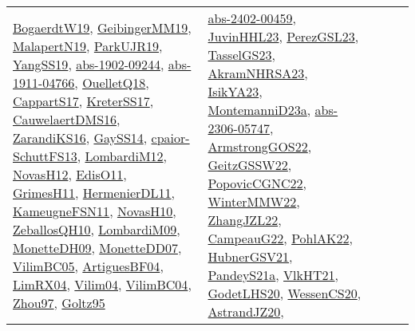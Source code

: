 {\begin{longtable}{lp{3cm}>{\raggedright}p{6cm}>{\raggedright}p{6cm}p{8cm}}
\href{papers/BogaerdtW19.pdf}{BogaerdtW19}\cite{BogaerdtW19}, \href{papers/GeibingerMM19.pdf}{GeibingerMM19}\cite{GeibingerMM19}, \href{papers/MalapertN19.pdf}{MalapertN19}\cite{MalapertN19}, \href{papers/ParkUJR19.pdf}{ParkUJR19}\cite{ParkUJR19}, \href{papers/YangSS19.pdf}{YangSS19}\cite{YangSS19}, \href{articles/abs-1902-09244.pdf}{abs-1902-09244}\cite{abs-1902-09244}, \href{articles/abs-1911-04766.pdf}{abs-1911-04766}\cite{abs-1911-04766}, \href{papers/OuelletQ18.pdf}{OuelletQ18}\cite{OuelletQ18}, \href{papers/CappartS17.pdf}{CappartS17}\cite{CappartS17}, \href{articles/KreterSS17.pdf}{KreterSS17}\cite{KreterSS17}, \href{papers/CauwelaertDMS16.pdf}{CauwelaertDMS16}\cite{CauwelaertDMS16}, \href{articles/ZarandiKS16.pdf}{ZarandiKS16}\cite{ZarandiKS16}, \href{papers/GaySS14.pdf}{GaySS14}\cite{GaySS14}, \href{papers/cpaior-SchuttFS13.pdf}{cpaior-SchuttFS13}\cite{cpaior-SchuttFS13}, \href{articles/LombardiM12.pdf}{LombardiM12}\cite{LombardiM12}, \href{articles/NovasH12.pdf}{NovasH12}\cite{NovasH12}, \href{papers/EdisO11.pdf}{EdisO11}\cite{EdisO11}, \href{papers/GrimesH11.pdf}{GrimesH11}\cite{GrimesH11}, \href{papers/HermenierDL11.pdf}{HermenierDL11}\cite{HermenierDL11}, \href{papers/KameugneFSN11.pdf}{KameugneFSN11}\cite{KameugneFSN11}, \href{articles/NovasH10.pdf}{NovasH10}\cite{NovasH10}, \href{articles/ZeballosQH10.pdf}{ZeballosQH10}\cite{ZeballosQH10}, \href{papers/LombardiM09.pdf}{LombardiM09}\cite{LombardiM09}, \href{papers/MonetteDH09.pdf}{MonetteDH09}\cite{MonetteDH09}, \href{papers/MonetteDD07.pdf}{MonetteDD07}\cite{MonetteDD07}, \href{articles/VilimBC05.pdf}{VilimBC05}\cite{VilimBC05}, \href{papers/ArtiguesBF04.pdf}{ArtiguesBF04}\cite{ArtiguesBF04}, \href{papers/LimRX04.pdf}{LimRX04}\cite{LimRX04}, \href{papers/Vilim04.pdf}{Vilim04}\cite{Vilim04}, \href{papers/VilimBC04.pdf}{VilimBC04}\cite{VilimBC04}, \href{articles/Zhou97.pdf}{Zhou97}\cite{Zhou97}, \href{papers/Goltz95.pdf}{Goltz95}\cite{Goltz95} & \href{articles/abs-2402-00459.pdf}{abs-2402-00459}\cite{abs-2402-00459}, \href{papers/JuvinHHL23.pdf}{JuvinHHL23}\cite{JuvinHHL23}, \href{papers/PerezGSL23.pdf}{PerezGSL23}\cite{PerezGSL23}, \href{papers/TasselGS23.pdf}{TasselGS23}\cite{TasselGS23}, \href{articles/AkramNHRSA23.pdf}{AkramNHRSA23}\cite{AkramNHRSA23}, \href{articles/IsikYA23.pdf}{IsikYA23}\cite{IsikYA23}, \href{articles/MontemanniD23a.pdf}{MontemanniD23a}\cite{MontemanniD23a}, \href{articles/abs-2306-05747.pdf}{abs-2306-05747}\cite{abs-2306-05747}, \href{papers/ArmstrongGOS22.pdf}{ArmstrongGOS22}\cite{ArmstrongGOS22}, \href{papers/GeitzGSSW22.pdf}{GeitzGSSW22}\cite{GeitzGSSW22}, \href{papers/PopovicCGNC22.pdf}{PopovicCGNC22}\cite{PopovicCGNC22}, \href{papers/WinterMMW22.pdf}{WinterMMW22}\cite{WinterMMW22}, \href{papers/ZhangJZL22.pdf}{ZhangJZL22}\cite{ZhangJZL22}, \href{articles/CampeauG22.pdf}{CampeauG22}\cite{CampeauG22}, \href{articles/PohlAK22.pdf}{PohlAK22}\cite{PohlAK22}, \href{articles/HubnerGSV21.pdf}{HubnerGSV21}\cite{HubnerGSV21}, \href{articles/PandeyS21a.pdf}{PandeyS21a}\cite{PandeyS21a}, \href{articles/VlkHT21.pdf}{VlkHT21}\cite{VlkHT21}, \href{papers/GodetLHS20.pdf}{GodetLHS20}\cite{GodetLHS20}, \href{papers/WessenCS20.pdf}{WessenCS20}\cite{WessenCS20}, \href{articles/AstrandJZ20.pdf}{AstrandJZ20}\cite{AstrandJZ20}, 
\end{longtable}}
